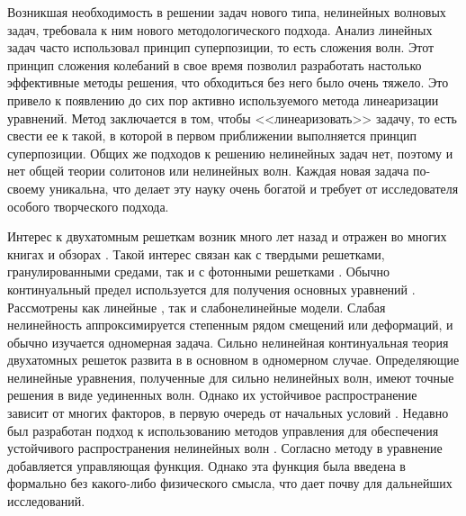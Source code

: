 Возникшая необходимость в решении задач нового типа, нелинейных волновых задач, требовала к ним нового методологического подхода. Анализ линейных задач часто использовал принцип суперпозиции, то есть сложения волн. Этот принцип сложения колебаний в свое время позволил разработать настолько эффективные методы решения, что обходиться без него было очень тяжело. Это привело к появлению до сих пор активно используемого метода линеаризации \cite{marsden1994mathematical} уравнений. Метод заключается в том, чтобы <<линеаризовать>> задачу, то есть свести ее к такой, в которой в первом приближении выполняется принцип суперпозиции. Общих же подходов к решению нелинейных задач нет, поэтому и нет общей теории солитонов или нелинейных волн. Каждая новая задача по-своему уникальна, что делает эту науку очень богатой и требует от исследователя особого творческого подхода.

Интерес к двухатомным решеткам возник много лет назад и отражен во многих книгах и обзорах \cite{bound_Born,bound_askar,bound_andr,bound_bril}. Такой интерес связан как с твердыми решетками, гранулированными средами, так и с фотонными решетками \cite{bound_Born,bound_askar,bound_andr, bound_kevr}. Обычно континуальный предел используется для получения основных уравнений \cite{bound_Born,bound_askar,bound_bril,bound_yajima, bound_pnevm, Pnevmatikos1986,bound_collins}. Рассмотрены как линейные \cite{bound_Born,bound_andr}, так и слабонелинейные \cite{bound_askar, bound_yajima, bound_pnevm, Pnevmatikos1986} модели. Слабая нелинейность аппроксимируется степенным рядом смещений или деформаций, и обычно изучается одномерная задача. Сильно нелинейная континуальная теория двухатомных решеток развита в \cite{bound_aero, bound_aerobul, bound_aeroplane, bound_pam09} в основном в одномерном случае. Определяющие нелинейные уравнения, полученные для сильно нелинейных волн, имеют точные решения в виде уединенных волн\cite{bound_pam09}. Однако их устойчивое распространение зависит от многих факторов, в первую очередь от начальных условий \cite{Porubov2011}. Недавно был разработан подход к использованию методов управления \cite{bound_fradkov} для обеспечения устойчивого распространения нелинейных волн \cite{bound_fradkov, porant16, porant17, Porubov2016}. Согласно методу в уравнение добавляется управляющая функция. Однако эта функция была введена в \cite{porant16, porant17, Porubov2016} формально без какого-либо физического смысла, что дает почву для дальнейших исследований.

